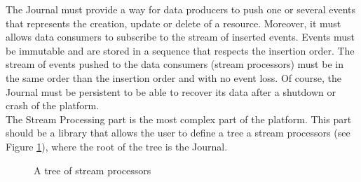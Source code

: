 The Journal must provide a way for data producers to push one or several events that represents the creation, update or 
delete of a resource. Moreover, it must allows data consumers to subscribe to the stream of inserted events. Events must be
immutable and are stored in a sequence that respects the insertion order. The stream of events pushed to the data consumers
(stream processors) must be in the same order than the insertion order and with no event loss. Of course, the Journal must be persistent to
be able to recover its data after a shutdown or crash of the platform.
\\

The Stream Processing part is the most complex part of the platform. This part should be a library that allows the user
to define a tree a stream processors (see Figure \ref{fig:tree}), where the root of the tree is the Journal. 

\begin{figure}[h]
  \begin{center} 
    \caption{A tree of stream processors}
    \label{fig:tree}
  \end{center}
\end{figure}

